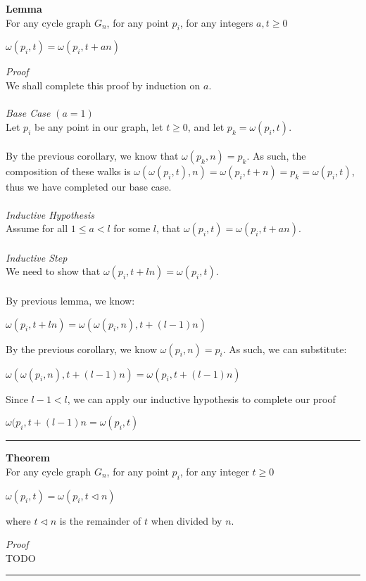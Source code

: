 \documentclass[a4paper,12pt]{article}
\begin{document}
\begin{tcolorbox}
\textbf{Lemma}\\
For any cycle graph $G_n$, for any point $p_i$, for any integers $a, t \geq 0$
\begin{center}
$\omega(p_i, t) = \omega(p_i, t + an)$
\end{center}
\end{tcolorbox}
\noindent
\textit{Proof}\\
We shall complete this proof by induction on $a$.\\
\\
\textit{Base Case} $(a = 1)$\\
Let $p_i$ be any point in our graph, let $t \geq 0$, and let $p_k = \omega(p_i, t)$.\\
\\
By the previous corollary, we know that $\omega(p_k, n) = p_k$. As such, the composition of these walks is $\omega(\omega(p_i, t), n) = \omega(p_i, t + n) = p_k = \omega(p_i, t)$, thus we have completed our base case.\\
\\
\textit{Inductive Hypothesis}\\
Assume for all $1 \leq a < l$ for some $l$, that $\omega(p_i, t) = \omega(p_i, t + an)$.\\
\\
\textit{Inductive Step}\\
We need to show that $\omega(p_i, t + ln) = \omega(p_i, t)$.\\
\\
By previous lemma, we know:
\begin{center}
$\omega(p_i, t + ln) = \omega(\omega(p_i, n), t + (l - 1)n)$
\end{center}
By the previous corollary, we know $\omega(p_i, n) = p_i$. As such, we can substitute:
\begin{center}
$\omega(\omega(p_i, n), t + (l - 1)n) = \omega(p_i, t + (l - 1)n)$
\end{center}
Since $l - 1 < l$, we can apply our inductive hypothesis to complete our proof
\begin{center}
$\omega(p_i, t + (l - 1)n = \omega(p_i, t)$
\end{center}

\begin{center}
\noindent\rule{8cm}{0.4pt}
\end{center}

\begin{tcolorbox}
\textbf{Theorem}\\
For any cycle graph $G_n$, for any point $p_i$, for any integer $t \geq 0$
\begin{center}
$\omega(p_i, t) = \omega(p_i, t \triangleleft n)$
\end{center}
where $t \triangleleft n $ is the remainder of $t$ when divided by $n$.
\end{tcolorbox}
\noindent
\textit{Proof}\\
TODO
\begin{center}
\noindent\rule{8cm}{0.4pt}
\end{center}
\end{document}
